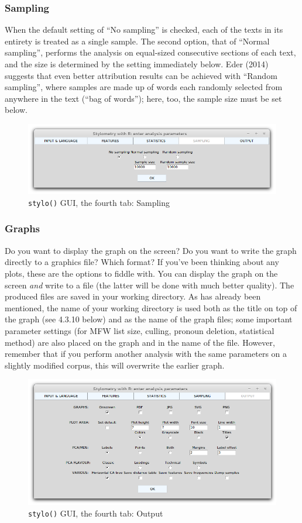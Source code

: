 \documentclass[11pt,a4paper]{article}
\def\code#1{{\tt #1}}
\begin{document}
\subsubsection{Sampling}

When the default setting of ``No sampling'' is checked, each of
the texts in its entirety is treated as a single sample. The second
option, that of ``Normal sampling'', performs the analysis on equal-sized
consecutive sections of each text, and the size is determined by the
setting immediately below. Eder (2014) suggests that even better attribution
results can be achieved with ``Random sampling'', where samples
are made up of words each randomly selected from anywhere in the text
(``bag of words''); here, too, the sample size must be set below.

\begin{figure}
  \centering
  \includegraphics[width=0.8\linewidth]{img/stylo-gui_tab4.png}
  \caption{\code{stylo()} GUI, the fourth tab: Sampling}
\end{figure}


\subsubsection{Graphs}

Do you want to display the graph on the screen? Do you want to write
the graph directly to a graphics file? Which format? If you've been
thinking about any plots, these are the options to fiddle with. You
can display the graph on the screen \emph{and} write to a file (the
latter will be done with much better quality). The produced files
are saved in your working directory. As has already been mentioned,
the name of your working directory is used both as the title on top
of the graph (see 4.3.10 below) and as the name of the graph files;
some important parameter settings (for MFW list size, culling, pronoun
deletion, statistical method) are also placed on the graph and in
the name of the file. However, remember that if you perform another
analysis with the same parameters on a slightly modified corpus, this
will overwrite the earlier graph.


\begin{figure}
  \centering
  \includegraphics[width=0.8\linewidth]{img/stylo-gui_tab5.png}
  \caption{\code{stylo()} GUI, the fourth tab: Output}
\end{figure}
\end{document}
